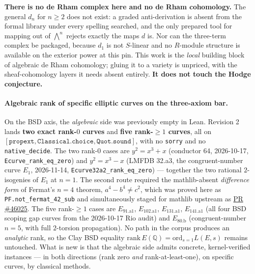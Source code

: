 \textbf{There is no de Rham complex here and no de Rham cohomology.} The
general $d_n$ for $n \ge 2$ does not exist: a graded anti-derivation is absent
from the formal library under every spelling searched, and the only prepared
tool for mapping out of $\bigwedge^n$ rejects exactly the maps $d$ is. Nor can
the three-term complex be packaged, because $d_1$ is not $S$-linear and no
$R$-module structure is available on the exterior power at this pin. This work
is the \emph{local} building block of algebraic de Rham cohomology; gluing it to
a variety is unpriced, with the sheaf-cohomology layers it needs absent
entirely. \textbf{It does not touch the Hodge conjecture.}

\paragraph{Algebraic rank of specific elliptic curves on the three-axiom bar.}
On the BSD axis, the \emph{algebraic} side was previously empty in Lean.
Revision 2 lands \textbf{two exact rank-$0$ curves} and \textbf{five
rank-$\ge 1$ curves}, all on $[\mathtt{propext}, \mathtt{Classical.choice},
\mathtt{Quot.sound}]$, with no \texttt{sorry} and no \texttt{native\_decide}.
The two rank-$0$ cases are
$y^2 = x^3 + x$ (conductor 64, 2026-10-17,
\texttt{Ecurve\_rank\_eq\_zero}) and
$y^2 = x^3 - x$ (LMFDB 32.a3, the congruent-number curve $E_1$,
2026-11-14, \texttt{Ecurve32a2\_rank\_eq\_zero}) --- together the
two rational $2$-isogenies of $E_1$ at $n = 1$.  The second route
required the mathlib-absent \emph{difference form} of Fermat's
$n = 4$ theorem, $a^4 - b^4 \ne c^2$, which was proved here as
\texttt{PF.not\_fermat\_42\_sub} and simultaneously staged for
mathlib upstream as
\href{https://github.com/leanprover-community/mathlib4/pull/46025}
{PR \#46025}.  The five rank-$\ge 1$ cases are $E_{91.\text{a}1}$,
$E_{102.\text{a}1}$, $E_{131.\text{a}1}$, $E_{141.\text{a}1}$
(all four BSD scoping gap curves from the 2026-10-17 Rio audit)
and $E_{80.\text{b}}$ (congruent-number $n = 5$, with full
$2$-torsion propagation).  No path in the corpus produces an
\emph{analytic} rank, so the Clay BSD equality
$\mathrm{rank}\,E(\mathbb{Q}) = \mathrm{ord}_{s=1} L(E, s)$ remains
untouched.  What is new is that the algebraic side admits concrete,
kernel-verified instances --- in both directions (rank zero \emph{and}
rank-at-least-one), on specific curves, by classical methods.

